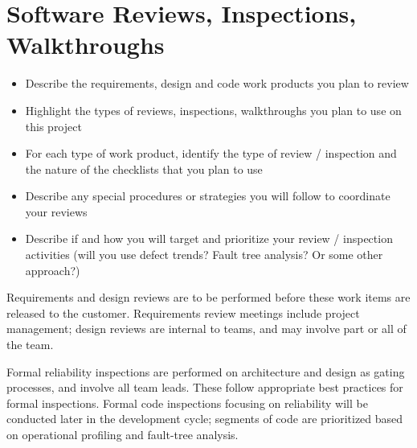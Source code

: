 \documentclass[11pt]{wacomepd}
\begin{document}
\chapter{Software Reviews, Inspections, Walkthroughs}
\begin{itemize}
\item Describe the requirements, design and code work products you plan to review
\item Highlight the types of reviews, inspections, walkthroughs you plan to use on this project
\item For each type of work product, identify the type of review / inspection and the nature of the
  checklists that you plan to use
\item Describe any special procedures or strategies you will follow to coordinate your reviews
\item Describe if and how you will target and prioritize your review / inspection activities (will
  you use defect trends? Fault tree analysis? Or some other approach?)
\end{itemize}

Requirements and design reviews are to be performed before these work items are released to the
customer.  Requirements review meetings include project management; design reviews are internal to
teams, and may involve part or all of the team.

Formal reliability inspections are performed on architecture and design as gating processes, and
involve all team leads.  These follow appropriate best practices for formal inspections.  Formal
code inspections focusing on reliability will be conducted later in the development cycle; segments
of code are prioritized based on operational profiling and fault-tree analysis.


\end{document}
